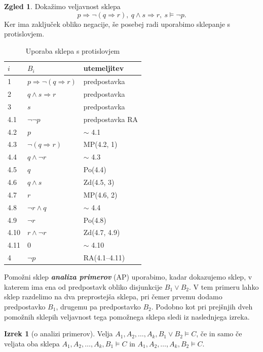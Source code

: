 \documentclass[11pt]{book}
\def\definicija{\color{rdeca}\bf\em}
\theoremstyle{definition}
\theoremstyle{zgled}
\newtheorem*{zgled}{Zgled}
\theoremstyle{odprtproblem}
\theoremstyle{domacanaloga}
\theoremstyle{izrek}
\newtheorem*{izrek}{Izrek}
\begin{document}
\begin{zgled}
Dokažimo veljavnost sklepa
\[
    p \Rightarrow \lnot (q \Rightarrow r), \ q \land s \Rightarrow r, \ s \models \lnot p.
\]
Ker ima zaključek obliko negacije, še posebej radi uporabimo sklepanje s protislovjem.

\begin{table}[h]
    \centering
    \begin{tabular}{lll}
        $i$ & $B_i$ & utemeljitev \\ \hline
        1 & $p \Rightarrow \lnot(q \Rightarrow r)$ & predpostavka \\
        2 & $q \land s \Rightarrow r$ & predpostavka \\
        3 & $s$ & predpostavka \\
        4.1 & $\lnot \lnot p$ & predpostavka RA \\
        4.2 & $p$ & $\sim$ 4.1 \\
        4.3 & $\lnot (q \Rightarrow r)$ & MP(4.2, 1) \\
        4.4 & $q \land \lnot r$ & $\sim$ 4.3 \\
        4.5 & $q$ & Po(4.4) \\
        4.6 & $q \land s$ & Zd(4.5, 3) \\
        4.7 & $r$ & MP(4.6, 2) \\
        4.8 & $\lnot r \land q$ & $\sim$ 4.4 \\
        4.9 & $\lnot r$ & Po(4.8) \\
        4.10 & $r \land \lnot r$ & Zd(4.7, 4.9) \\
        4.11 & $0$ & $\sim$ 4.10 \\
        4 & \underline{$\lnot p$} & RA(4.1--4.11) \\
    \end{tabular}
    \caption{Uporaba sklepa s protislovjem}
\end{table}
\end{zgled}

Pomožni sklep {\definicija analiza primerov} (AP) uporabimo, kadar dokazujemo sklep, v katerem ima ena od predpostavk obliko disjunkcije $B_1 \lor B_2$. V tem primeru lahko sklep razdelimo na dva preprostejša sklepa, pri čemer prvemu dodamo predpostavko $B_1$, drugemu pa predpostavko $B_2$. Podobno kot pri prejšnjih dveh pomožnih sklepih veljavnost tega pomožnega sklepa sledi iz naslednjega izreka.

\begin{izrek}[o analizi primerov]
Velja $A_1, A_2, \dots, A_k, B_1 \lor B_2 \models C$, če in samo če veljata oba sklepa $A_1, A_2, \dots, A_k, B_1 \models C$ in $A_1, A_2, \dots, A_k, B_2 \models C$.
\end{izrek}
\end{document}
